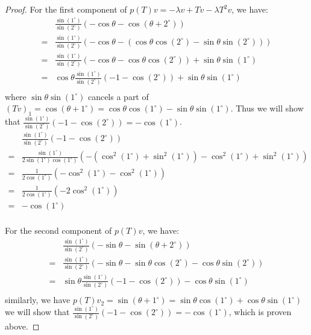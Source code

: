 \documentclass[../main.tex]{subfiles}
\begin{document}
\begin{proof}
  For the first component of $p(T)v = - \lambda v + Tv - \lambda T^2v$, we have:
  \begin{align*}
     & \frac{\sin(1^\circ)}{\sin(2^\circ)} (- \cos \theta - \cos (\theta + 2^\circ)) \\
    =& \frac{\sin(1^\circ)}{\sin(2^\circ)} (- \cos \theta - (\cos \theta \cos(2^\circ) - \sin \theta \sin (2^\circ))) \\
    =& \frac{\sin(1^\circ)}{\sin(2^\circ)} (- \cos \theta - \cos \theta \cos(2^\circ)) + \sin \theta \sin (1^\circ) \\
    =& \cos \theta \frac{\sin(1^\circ)}{\sin(2^\circ)} (- 1 - \cos(2^\circ)) + \sin \theta \sin (1^\circ) \\
  \end{align*}
  where $\sin \theta \sin(1^\circ)$ cancels a part of
  $(Tv)_1 = \cos(\theta + 1^\circ) = \cos \theta \cos (1^\circ) - \sin \theta \sin (1^\circ)$.
  Thus we will show that $\frac{\sin(1^\circ)}{\sin(2^\circ)} (- 1 - \cos(2^\circ)) = - \cos (1^\circ)$.
  \begin{align*}
     & \frac{\sin(1^\circ)}{\sin(2^\circ)} (- 1 - \cos(2^\circ)) \\
    =& \frac{\sin(1^\circ)}{2\sin(1^\circ)\cos(1^\circ)} (- (\cos^2(1^\circ) + \sin^2(1^\circ)) - \cos^2(1^\circ) + \sin^2(1^\circ)) \\
    =& \frac{1}{2\cos(1^\circ)} (- \cos^2(1^\circ) - \cos^2(1^\circ)) \\
    =& \frac{1}{2\cos(1^\circ)} (- 2 \cos^2(1^\circ)) \\
    =& - \cos(1^\circ) \\
  \end{align*}

  For the second component of $p(T)v$, we have:
  \begin{align*}
     & \frac{\sin(1^\circ)}{\sin(2^\circ)} (- \sin \theta - \sin (\theta + 2^\circ)) \\
    =& \frac{\sin(1^\circ)}{\sin(2^\circ)} (- \sin \theta - \sin \theta \cos(2^\circ) - \cos \theta \sin (2^\circ)) \\
    =& \sin \theta \frac{\sin(1^\circ)}{\sin(2^\circ)} (- 1 - \cos(2^\circ)) - \cos \theta \sin (1^\circ) \\
  \end{align*}
  similarly, we have $p(T)v_2 = \sin (\theta + 1^\circ) = \sin \theta \cos (1^\circ) + \cos \theta \sin (1^\circ)$ we will show that $\frac{\sin(1^\circ)}{\sin(2^\circ)} (- 1 - \cos(2^\circ)) = - \cos (1^\circ)$,
  which is proven above.
\end{proof}
\end{document}
